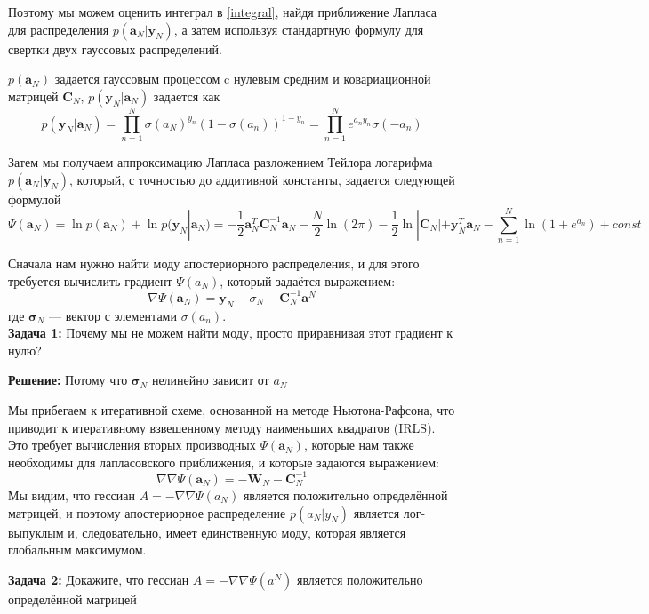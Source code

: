 {Поэтому мы можем оценить интеграл в \ref{integral}, найдя приближение Лапласа
для распределения $p(\mathbf{a}_{N}|\mathbf{y}_{N})$, а затем используя стандартную формулу для
свертки двух гауссовых распределений.

$p(\mathbf{a}_{N})$ задается гауссовым процессом c нулевым средним и ковариационной матрицей $\mathbf{C}_{N}$, $p(\mathbf{y}_{N}|\mathbf{a}_{N})$ задается как
\[
p(\mathbf{y}_{N}|\mathbf{a}_{N})=\displaystyle \prod_{n=1}^{N}\sigma(a_{N})^{y_n}(1-\sigma(a_{n}))^{1-y_n} =
\displaystyle \prod_{n=1}^{N} e^{a_ny_n}\sigma(-a_n)\]

Затем мы получаем аппроксимацию Лапласа разложением Тейлора логарифма $p(\mathbf{a}_{N}|\mathbf{y}_N)$, который, с точностью до аддитивной константы, задается следующей формулой
\begin{equation}
\label{PSI}
 \Psi(\mathbf{a}_N) = \ln p(\mathbf{a}_{N})+\ln p(\mathbf{y}_N|\mathbf{a}_N)
 = -\frac{1}{2}\mathbf{a}^{T}_N\mathbf{C}^{-1}_N \mathbf{a}_N-\frac{N}{2} \ln(2\pi)-\frac{1}{2}\ln|\mathbf{C}_N|+\mathbf{y}^T_N\mathbf{a}_N-\displaystyle \sum^{N}_{n=1}\ln(1+e^{a_n})+const
\end{equation}

Сначала нам нужно найти моду апостериорного распределения, и для этого требуется вычислить градиент $\Psi(a_N)$, который задаётся выражением:
\[
\nabla \Psi(\mathbf{a}_N) = \mathbf{y}_N - \sigma_{N} - \mathbf{C}_{N}^{-1}\mathbf{a}^N
\]
где $\mathbf{\sigma}_N$ — вектор с элементами $\sigma(a_n)$. \\

\textbf{Задача 1:}
Почему мы не можем найти моду, просто приравнивая этот градиент к нулю? 

\textbf{Решение:}
Потому что $\mathbf{\sigma}_N$ нелинейно зависит от $a_N$ 

Мы прибегаем к итеративной схеме, основанной на методе Ньютона-Рафсона, что приводит к итеративному взвешенному методу наименьших квадратов (IRLS). Это требует вычисления вторых производных $\Psi(\mathbf{a}_N)$, которые нам также необходимы для лапласовского приближения, и которые задаются выражением:
\[
\nabla \nabla \Psi(\mathbf{a}_N) = -\mathbf{W}_{N} - \mathbf{C}_{N}^{-1} 
\]
Мы видим, что гессиан $A=-\nabla \nabla \Psi(a_N)$ является положительно определённой матрицей, и поэтому апостериорное распределение $p(a_N|y_N)$ является лог-выпуклым и, следовательно, имеет единственную моду, которая является глобальным максимумом.

\textbf{Задача 2:}
Докажите, что гессиан $A=-\nabla \nabla \Psi(a^N)$ является положительно определённой матрицей


}
